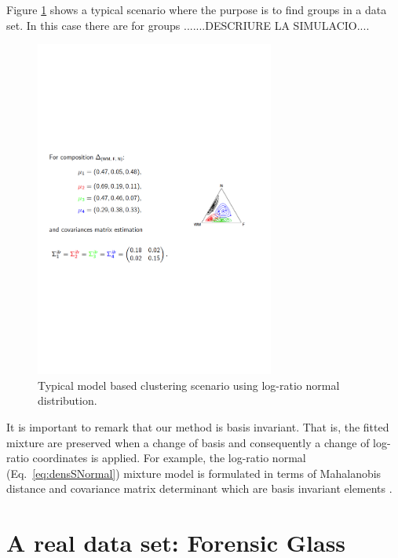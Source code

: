 \documentclass[preprint, review, 3p, authoryear]{elsarticle}
\begin{document}
Figure \ref{fig03logratiodens} shows a typical scenario where the purpose is to find groups in a data set. In this case there are for groups .......DESCRIURE LA SIMULACIO....

\begin{figure}[htbp]
\centering
\includegraphics[trim=0cm 6cm 0cm 6cm,width=0.7\textwidth]{fig03_logratiodens.pdf}
\caption{Typical model based clustering scenario using log-ratio normal distribution.}
\label{fig03logratiodens}
\end{figure}

It is important to remark that our method is basis invariant. That is, the fitted mixture are preserved when a change of basis and consequently a change of log-ratio coordinates is applied. For example, the log-ratio normal (Eq.~\ref{eq:densSNormal}) mixture model is formulated in terms of Mahalanobis distance and covariance matrix determinant which are basis invariant elements
 \citep{barcelo1999comment}. 

\section{A real data set: Forensic Glass}
\label{example_section}
\end{document}
